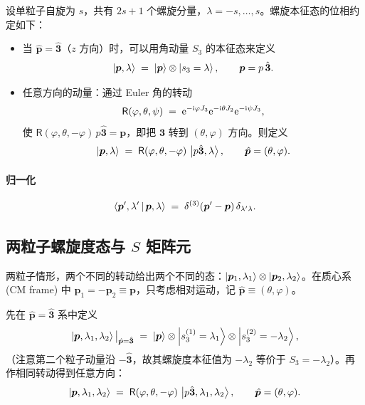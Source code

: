 设单粒子自旋为 $s$，共有 $2s+1$ 个螺旋分量，$\lambda=-s,\dots,s$。螺旋本征态的位相约定如下：
\begin{itemize}
  \item 当 $\hat{\bm p}=\hat{\bm 3}$（$z$ 方向）时，可以用角动量 $S_3$ 的本征态来定义
  \begin{equation}
    \ket{\bm p,\lambda} \;=\; \ket{\bm p}\otimes \ket{s_3=\lambda}, \qquad \bm p = p\,\hat{\bm 3}.
    \label{eq:hel-z}
  \end{equation}
  \item 任意方向的动量：通过 Euler 角的转动
  \begin{equation}
    \mathsf{R}(\varphi,\theta,\psi)\;=\;\mathrm{e}^{-\mathrm{i}\varphi J_3}\mathrm{e}^{-\mathrm{i}\theta J_2}\mathrm{e}^{-\mathrm{i}\psi J_3},
    \label{eq:Rotation-Euler}
  \end{equation}
  使 $\mathsf{R}(\varphi,\theta,-\varphi)\,p\hat{\bm 3} = \bm p$，即把 $\hat{\bm 3}$ 转到 $(\theta,\varphi)$ 方向。则定义
  \begin{equation}
    \ket{\bm p,\lambda} \;=\; \mathsf{R}(\varphi,\theta,-\varphi)\,\ket{p\hat{\bm 3},\lambda}, \qquad \hat{\bm p}=(\theta,\varphi).
    \label{eq:hel-rot}
  \end{equation}
\end{itemize}

\paragraph{归一化}
\begin{equation}
  \left\langle \bm p',\lambda' \,\middle|\, \bm p,\lambda \right\rangle \;=\; \delta^{(3)}(\bm p'-\bm p)\,\delta_{\lambda'\lambda}.
  \label{eq:hel-norm-1p}
\end{equation}

\subsection{两粒子螺旋度态与 $S$ 矩阵元}

两粒子情形，两个不同的转动给出两个不同的态：$\ket{\bm p_1,\lambda_1}\otimes \ket{\bm p_2,\lambda_2}$。在质心系 (CM frame) 中 $\bm p_1=-\bm p_2\equiv\bm p$，只考虑相对运动，记 $\hat{\bm p}\equiv(\theta,\varphi)$。

先在 $\hat{\bm p}=\hat{\bm 3}$ 系中定义
\begin{equation}
  \ket{\bm p,\lambda_1,\lambda_2}\big|_{\hat{\bm p}=\hat{\bm 3}}
  \;=\; \ket{\bm p}\otimes\ket{s_3^{(1)}=\lambda_1}\otimes \ket{s_3^{(2)}=-\lambda_2},
  \label{eq:hel-2p-z}
\end{equation}
（注意第二个粒子动量沿 $-\hat{\bm 3}$，故其螺旋度本征值为 $-\lambda_2$ 等价于 $S_3=-\lambda_2$）。再作相同转动得到任意方向：
\begin{equation}
  \ket{\bm p,\lambda_1,\lambda_2} \;=\; \mathsf{R}(\varphi,\theta,-\varphi)\,\ket{p\hat{\bm 3},\lambda_1,\lambda_2}, \qquad \hat{\bm p}=(\theta,\varphi).
  \label{eq:hel-2p-any}
\end{equation}


